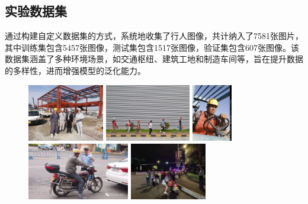 \documentclass[journal]{IEEEtran}
\numberwithin{figure}{section}%
\begin{document}
\subsection{实验数据集}
通过构建自定义数据集的方式，系统地收集了行人图像，共计纳入了7581张图片，其中训练集包含5457张图像，测试集包含1517张图像，验证集包含607张图像。该数据集涵盖了多种环境场景，如交通枢纽、建筑工地和制造车间等，旨在提升数据的多样性，进而增强模型的泛化能力。\par

\begin{figure}[h]
	
	\begin{minipage}{0.32\linewidth}
		\vspace{3pt}
		\centerline{\includegraphics[width=\textwidth,height=2.5cm]{figures/2_1.jpg}}
		\centerline{\includegraphics[width=\textwidth,height=2.5cm]{figures/2_2.jpg}}
	\end{minipage}
	\begin{minipage}{0.32\linewidth}
		\vspace{3pt}
		\centerline{\includegraphics[width=\textwidth,height=2.5cm]{figures/2_3.jpg}}
	 
		\centerline{\includegraphics[width=\textwidth,height=2.5cm]{figures/2_4.jpg}}
	\end{minipage}
	\begin{minipage}{0.32\linewidth}
		\vspace{3pt}
		\centerline{\includegraphics[width=\textwidth,height=2.5cm]{figures/2_5.jpg}}
	 

\end{minipage}
\end{figure}
\end{document}
